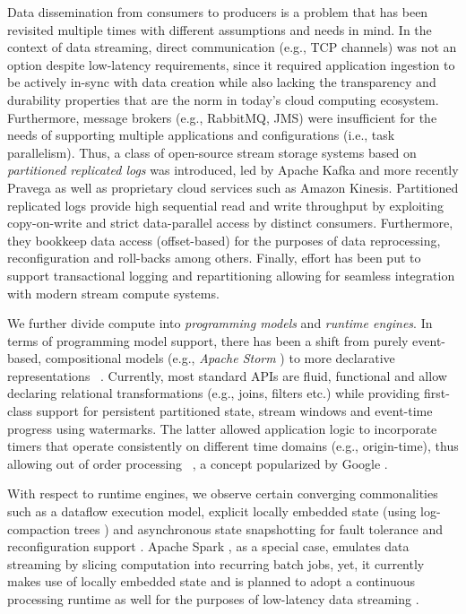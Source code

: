 Data dissemination from consumers to producers is a problem that has been revisited multiple times with different assumptions and needs in mind. In the context of data streaming, direct communication (e.g., TCP channels) was not an option despite low-latency requirements, since it required application ingestion to be actively in-sync with data creation while also lacking the transparency and durability properties that are the norm in today's cloud computing ecosystem. Furthermore, message brokers (e.g., RabbitMQ, JMS) were insufficient for the needs of supporting multiple applications and configurations (i.e., task parallelism). Thus, a class of open-source stream storage systems based on \emph{partitioned replicated logs} was introduced, led by Apache Kafka \cite{kreps2011kafka} and more recently Pravega \cite{CUSTOM:web/pravega} as well as proprietary cloud services such as Amazon Kinesis. Partitioned replicated logs provide high sequential read and write throughput by exploiting copy-on-write and strict data-parallel access by distinct consumers. Furthermore, they bookkeep data access (offset-based) for the purposes of data reprocessing, reconfiguration and roll-backs among others. Finally, effort has been put to support transactional logging and repartitioning allowing for seamless integration with modern stream compute systems.

 We further divide compute into \emph{programming models} and \emph{runtime engines}. In terms of programming model support, there has been a shift from purely event-based, compositional models (e.g., \emph{Apache Storm} \cite{CUSTOM:web/Storm}) to more declarative representations ~\cite{carbone_et_al_2015,akidau2015dataflow,CUSTOM:web/apex,zaharia_et_al_2013,CUSTOM:web/kafkastreams}. Currently, most standard APIs are fluid, functional and allow declaring relational transformations (e.g., joins, filters etc.) while providing first-class support for persistent partitioned state, stream windows and event-time progress using watermarks. The latter allowed application logic to incorporate timers that operate consistently on different time domains (e.g., origin-time), thus allowing out of order processing ~\cite{srivastava2004flexible,li2008out},  a concept popularized by Google \cite{millwheel,akidau2015dataflow}. 

With respect to runtime engines, we observe certain converging commonalities such as a dataflow execution model, explicit locally embedded state (using log-compaction trees \cite{CUSTOM:web/rocksdb}) and asynchronous state snapshotting for fault tolerance and reconfiguration support \cite{state2017carbone,jacques2016consistent}. Apache Spark \cite{zaharia_et_al_2013}, as a special case, emulates data streaming by slicing computation into recurring batch jobs, yet, it currently makes use of locally embedded state and is planned to adopt a continuous processing runtime as well for the purposes of low-latency data streaming \cite{CUSTOM:web/sparkcontinuous}.

